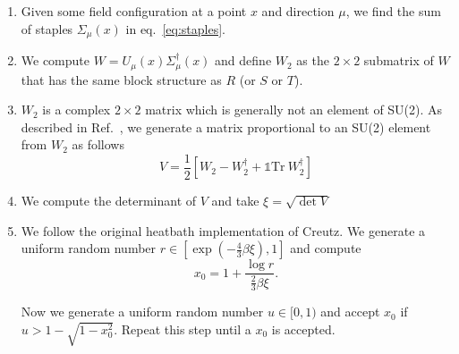 \documentclass[12pt,a4paper]{article}
\begin{document}
\begin{enumerate}
	\item Given some field configuration at a point $x$ and direction $\mu$, we find the sum of staples $\Sigma_{\mu}(x)$ in eq.\ \eqref{eq:staples}.
	
	\item We compute $W = U_{\mu}(x) \Sigma_{\mu}^{\dagger}(x)$ and define $W_2$ as the $2\times 2$ submatrix of $W$ that has the same block structure as $R$ (or $S$ or $T$).
	
	\item $W_2$ is a complex $2\times 2$ matrix which is generally not an element of SU(2). As described in Ref.\ \cite{kennedy1985}, we generate a matrix proportional to an SU(2) element from $W_2$ as follows
	\begin{equation}
	V = \frac{1}{2} \left[ W_2 - W_2^{\dagger} + \mathds{1}\text{Tr}\ W_2^{\dagger}\right]
	\end{equation}
	\item We compute the determinant of $V$ and take $\xi = \sqrt{\det V}$
	
	\item We follow the original heatbath implementation of Creutz. We generate a uniform random number $r \in [\exp(-\frac{4}{3}\beta \xi),1]$ and compute
	\begin{equation}
		x_0 = 1 + \frac{\log r}{\frac{2}{3}\beta \xi}.
	\end{equation}		
	
	Now we generate a uniform random number $u\in [0,1)$ and accept $x_0$ if $ u > 1 - \sqrt{1-x_0^2}$. Repeat this step until a $x_0$ is accepted.
	

\end{enumerate}
\end{document}
